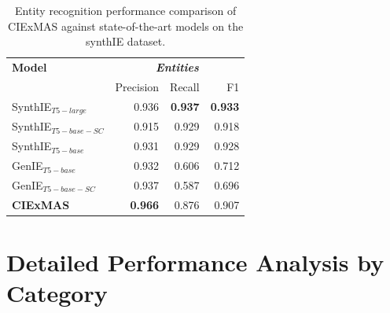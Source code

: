 \documentclass[a4paper,oneside,bibliography=totoc]{scrbook}
\begin{document}
\begin{table}[h]
  \centering
  \begin{tabular}{l|rrr}
    \toprule
    \textbf{Model}         & \multicolumn{3}{c}{\textit{\textbf{Entities}}}                                   \\
                           & Precision                                      & Recall         & F1             \\
    \midrule
    SynthIE$_{T5-large}$   & 0.936                                          & \textbf{0.937} & \textbf{0.933} \\
    SynthIE$_{T5-base-SC}$ & 0.915                                          & 0.929          & 0.918          \\
    SynthIE$_{T5-base}$    & 0.931                                          & 0.929          & 0.928          \\
    GenIE$_{T5-base}$      & 0.932                                          & 0.606          & 0.712          \\
    GenIE$_{T5-base-SC}$   & 0.937                                          & 0.587          & 0.696          \\
    \midrule
    \textbf{CIExMAS}       & \textbf{0.966}                                 & 0.876          & 0.907          \\
    \bottomrule
  \end{tabular}
  \caption{Entity recognition performance comparison of CIExMAS against state-of-the-art models on the synthIE dataset.}
  \label{tab:evaluation_entities}
\end{table}



\clearpage
\section{Detailed Performance Analysis by Category}
\end{document}
